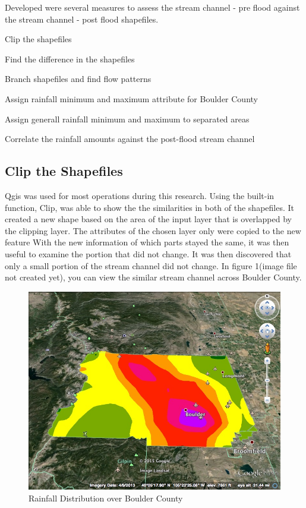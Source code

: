 \documentclass[twoside]{article}
\begin{document}
\begin{multicols}{2}
Developed were several measures to assess the stream channel - pre flood against the stream channel - post flood shapefiles.
\begin{compactitem}
\item Clip the shapefiles
\item Find the difference in the shapefiles
\item Branch shapefiles and find flow patterns
\item Assign rainfall minimum and maximum attribute for Boulder County
\item Assign generall rainfall minimum and maximum to separated areas
\item Correlate the rainfall amounts against the post-flood stream channel
\end{compactitem}
\subsection{Clip the Shapefiles}
Qgis was used for most operations during this research. Using the built-in function, Clip, was able to show the the similarities in both of the shapefiles. It created a new shape based on the area of the input layer that is overlapped by the clipping layer. The attributes of the chosen layer only were copied to the new feature With the new information of which parts stayed the same, it was then useful to examine the portion that did not change. It was then discovered that only a small portion of the stream channel did not change. In figure 1(image file not created yet), you can view the similar stream channel across Boulder County.

\begin{figure} %
\includegraphics[width=2\columnwidth]{earth.jpg}
\caption{Rainfall Distribution over Boulder County\label{fig:earth}}
\end{figure}


\end{multicols}
\end{document}

